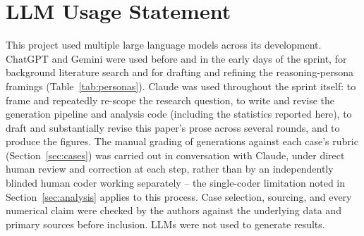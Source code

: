 \documentclass[11pt]{article}
\begin{document}
\section*{LLM Usage Statement}
This project used multiple large language models across its
development. ChatGPT and Gemini were used before and in the early days
of the sprint, for background literature search and for drafting and
refining the reasoning-persona framings (Table~\ref{tab:personas}).
Claude was used throughout the sprint itself: to frame and repeatedly
re-scope the research question, to write and revise the generation
pipeline and analysis code (including the statistics reported here), to
draft and substantially revise this paper's prose across several rounds,
and to produce the figures. The manual grading of generations against
each case's rubric (Section~\ref{sec:cases}) was carried out in
conversation with Claude, under direct human review and correction at
each step, rather than by an independently blinded human coder working
separately -- the single-coder limitation noted in
Section~\ref{sec:analysis} applies to this process. Case selection,
sourcing, and every numerical claim were checked by the authors against
the underlying data and primary sources before inclusion.  LLMs were not used to generate results. 
\end{document}
